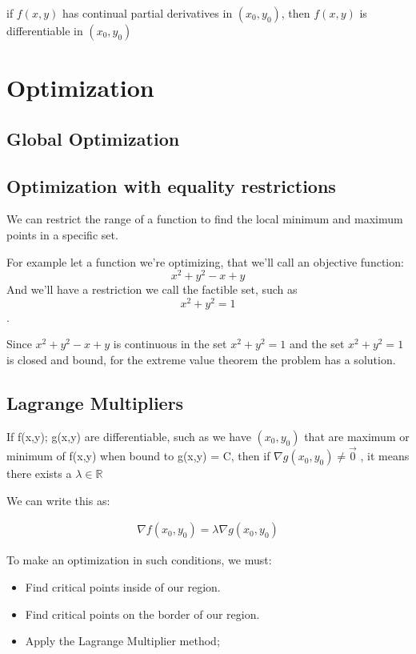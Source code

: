 \documentclass[11pt,fleqn]{book} %
\begin{document}
if $f(x,y)$ has continual partial derivatives in $(x_0, y_0)$, then $f(x,y)$
is differentiable in $(x_0,y_0)$

\chapter{Optimization}

\section{Global Optimization}

\section{Optimization with equality restrictions}

We can restrict the range of a function to find the local minimum and maximum points in 
a specific set. 

For example let a function we're optimizing, that we'll call an objective function:
$$x^2 + y^2 -x+y$$ And we'll have a restriction we call the factible set, such as $$x^2+y^2=1$$.

Since $x^2+y^2-x+y$ is continuous in the set $x^2+y^2=1$ and the set
$x^2+y^2=1$ is closed and bound, for the extreme value theorem the problem has a solution.

\section{Lagrange Multipliers}
If f(x,y); g(x,y) are differentiable, such as we have $(x_0,y_0)$ that are maximum or minimum
of f(x,y) when bound to g(x,y) = C, then if $\nabla g(x_0, y_0) \neq \vec{0}$ , it means there exists a $\lambda \in \mathbb{R}$

We can write this as:

\begin{gather}
    \nabla f(x_0,y_0) = \lambda \nabla g(x_0, y_0)
\end{gather}

To make an optimization in such conditions, we must:
\begin{itemize}
    \item Find critical points inside of our region. 
    \item Find critical points on the border of our region. 
    \item Apply the Lagrange Multiplier method;
\end{itemize}
\end{document}
